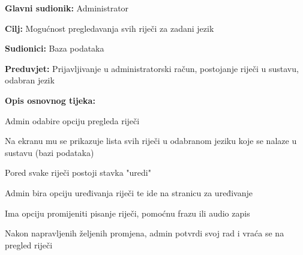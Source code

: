 \noindent {}
\begin{packed_item}

	\item \textbf{Glavni sudionik: } Administrator
	\item \textbf{Cilj: } Mogućnost pregledavanja svih riječi za zadani jezik
	\item \textbf{Sudionici: } Baza podataka
	\item \textbf{Preduvjet: } Prijavljivanje u administratorski račun, postojanje riječi u sustavu, odabran jezik
	\item  \textbf{Opis osnovnog tijeka:}
	
	\item[] \begin{packed_enum}
		
		\item Admin odabire opciju pregleda riječi
		\item Na ekranu mu se prikazuje lista svih riječi u odabranom jeziku koje se nalaze u sustavu (bazi podataka)
		\item Pored svake riječi postoji stavka "uredi"
		\item Admin bira opciju uređivanja riječi te ide na stranicu za uređivanje
		\item Ima opciju promijeniti pisanje riječi, pomoćnu frazu ili audio zapis
		\item Nakon napravljenih željenih promjena, admin potvrdi svoj rad i vraća se na pregled riječi

	\end{packed_enum}
	
\end{packed_item}

